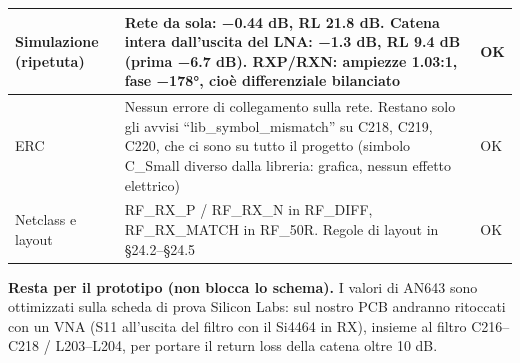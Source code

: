 {\begin{xltabular}{\linewidth}{>{\hsize\raggedright\arraybackslash}X>{\hsize\raggedright\arraybackslash}X>{\hsize\raggedright\arraybackslash}X}
Simulazione (ripetuta) & Rete da sola: −0.44 dB, RL 21.8 dB. Catena intera dall'uscita del LNA: −1.3 dB, RL 9.4 dB (prima −6.7 dB). RXP/\allowbreak{}RXN: ampiezze 1.03:1, fase −178°, cioè differenziale bilanciato & OK \\\midrule[0.15pt]
ERC & Nessun errore di collegamento sulla rete. Restano solo gli avvisi \textquotedblleft{}lib\_\allowbreak{}symbol\_\allowbreak{}mismatch\textquotedblright{} su C218, C219, C220, che ci sono su tutto il progetto (simbolo C\_\allowbreak{}Small diverso dalla libreria: grafica, nessun effetto elettrico) & OK \\\midrule[0.15pt]
Netclass e layout & RF\_\allowbreak{}RX\_\allowbreak{}P /\allowbreak{} RF\_\allowbreak{}RX\_\allowbreak{}N in RF\_\allowbreak{}DIFF, RF\_\allowbreak{}RX\_\allowbreak{}MATCH in RF\_\allowbreak{}50R. Regole di layout in §24.2–§24.5 & OK \\
\end{xltabular}}

\textbf{Resta per il prototipo (non blocca lo schema).} I valori di AN643 sono ottimizzati sulla scheda di prova Silicon Labs: sul nostro PCB andranno ritoccati con un VNA (S11 all'uscita del filtro con il Si4464 in RX), insieme al filtro C216–C218 /\allowbreak{} L203–L204, per portare il return loss della catena oltre 10 dB.
